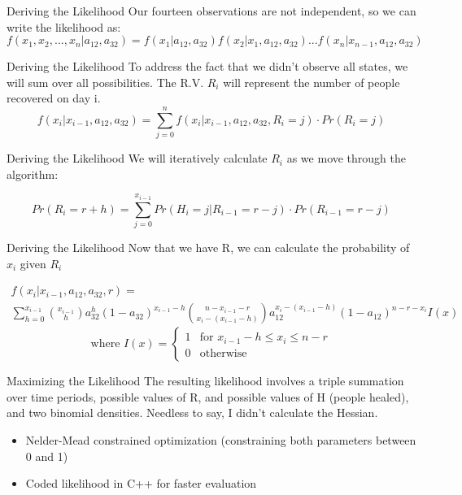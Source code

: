 \documentclass[10pt,table]{beamer}
\begin{document}
\begin{frame}{Deriving the Likelihood}
Our fourteen observations are not independent, so we can write the likelihood as: 
$$
f(x_1, x_2,...,x_n| a_{12}, a_{32}) = f(x_1| a_{12}, a_{32}) f(x_2|x_1, a_{12}, a_{32}) ... f(x_n|x_{n-1}, a_{12}, a_{32})
$$
\end{frame}

\begin{frame}{Deriving the Likelihood}
To address the fact that we didn't observe all states, we will sum over all possibilities. The R.V. $R_i$ will represent the number of people recovered on day i.
$$
f(x_i | x_{i-1}, a_{12}, a_{32}) =\sum_{j=0}^n f(x_i | x_{i-1}, a_{12}, a_{32}, R_i=j)\cdot Pr(R_i=j) 
\label{sum}
$$
\end{frame}


\begin{frame}{Deriving the Likelihood}
We will iteratively calculate $R_i$ as we move through the algorithm:

$$
Pr(R_i = r + h) = \sum_{j=0}^{x_{i-1}} Pr(H_i=j|R_{i-1}=r-j)\cdot Pr(R_{i-1}=r-j)
$$
\end{frame}

\begin{frame}{Deriving the Likelihood}
Now that we have R, we can calculate the probability of $x_i$ given $R_i$

\begin{multline*}
f(x_i|x_{i-1}, a_{12}, a_{32}, r) = \\ \sum_{h=0}^{x_{i-1}}       {{x_{i-1}}\choose{h}} a_{32}^h(1-a_{32})^{x_{i-1}-h}  {{n-x_{i-1}-r}\choose{x_i-(x_{i-1}-h)}}  a_{12}^{x_i-(x_{i-1}-h)} (1-a_{12})^{n - r - x_i}I(x)  \end{multline*} $$
\text{where } I(x) = \begin{cases} 1 & \text{for } x_{i-1}-h\leq x_i\leq n-r  \\ 0 &\text{otherwise} \end{cases}$$


\end{frame}
\begin{frame}{Maximizing the Likelihood}
The resulting likelihood involves a triple summation over time periods, possible values of R, and possible values of H (people healed), and two binomial densities. Needless to say, I didn't calculate the Hessian. 
\begin{itemize}
\item Nelder-Mead constrained optimization (constraining both parameters between 0 and 1)
\item Coded likelihood in C++ for faster evaluation
\end{itemize}

\end{frame}
\end{document}
